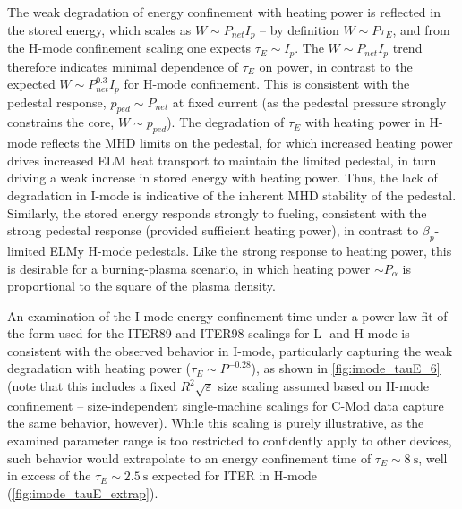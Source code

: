 \documentclass[ twoside,openright,titlepage,numbers=noenddot,headinclude,%
                footinclude=true,cleardoublepage=empty,abstractoff, %
                BCOR=5mm,paper=letter,fontsize=11pt,%
                ngerman,american,%
                ]{scrreprt}
\begin{document}
The weak degradation of energy confinement with heating power is reflected in the stored energy, which scales as $W \sim P_{net} I_p$ -- by definition $W \sim P \tau_E$, and from the H-mode confinement scaling one expects $\tau_E \sim I_p$.  The $W \sim P_{net} I_p$ trend therefore indicates minimal dependence of $\tau_E$ on power, in contrast to the expected $W \sim P_{net}^{0.3} I_p$ for H-mode confinement.  This is consistent with the pedestal response, $p_{ped} \sim P_{net}$ at fixed current (as the pedestal pressure strongly constrains the core, $W \sim p_{ped}$).  The degradation of $\tau_E$ with heating power in H-mode reflects the MHD limits on the pedestal, for which increased heating power drives increased ELM heat transport to maintain the limited pedestal, in turn driving a weak increase in stored energy with heating power.  Thus, the lack of degradation in I-mode is indicative of the inherent MHD stability of the pedestal.  Similarly, the stored energy responds strongly to fueling, consistent with the strong pedestal response (provided sufficient heating power), in contrast to $\beta_p$-limited ELMy H-mode pedestals.  Like the strong response to heating power, this is desirable for a burning-plasma scenario, in which heating power $\sim P_{\alpha}$ is proportional to the square of the plasma density.

An examination of the I-mode energy confinement time under a power-law fit of the form used for the ITER89 and ITER98 scalings for L- and H-mode is consistent with the observed behavior in I-mode, particularly capturing the weak degradation with heating power ($\tau_E \sim P^{-0.28}$), as shown in \cref{fig:imode_tauE_6} (note that this includes a fixed $R^2 \sqrt{\varepsilon}$ size scaling assumed based on H-mode confinement -- size-independent single-machine scalings for C-Mod data capture the same behavior, however).  While this scaling is purely illustrative, as the examined parameter range is too restricted to confidently apply to other devices, such behavior would extrapolate to an energy confinement time of $\tau_E \sim \SI{8}{\second}$, well in excess of the $\tau_E \sim \SI{2.5}{\second}$ expected for ITER in H-mode (\cref{fig:imode_tauE_extrap}).
\end{document}
